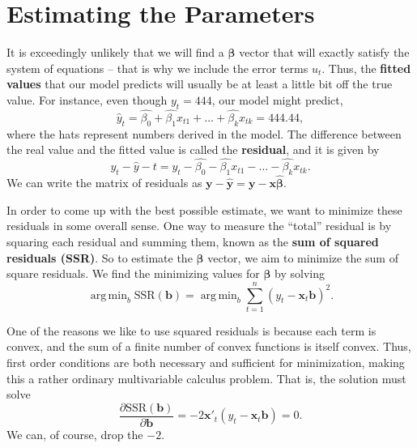 \documentclass[12pt]{article}
\renewcommand{\vec}[1]{\mathbf{#1}}
\renewcommand{\hat}[1]{\widehat{#1}}
\DeclareMathOperator*{\argmin}{arg\,min}
\theoremstyle{definition}
\begin{document}
\section{Estimating the Parameters}
It is exceedingly unlikely that we will find a $\bm{\beta}$ vector that will exactly satisfy the system of equations -- that is why we include the error terms $u_t$. Thus, the \textbf{fitted values} that our model predicts will usually be at least a little bit off the true value. For instance, even though $y_t=444$, our model might predict,
	\[	\hat{y}_t =\hat{\beta_0} + \hat{\beta_1}x_{t1} + \hdots + \hat{\beta_k} x_{tk} =  444.44,	\]
where the hats represent numbers derived in the model. The difference between the real value and the fitted value is called the \textbf{residual}, and it is given by 
	\[	y_t - \hat{y}-t = y_t - \hat{\beta_0} - \hat{\beta_1} x_{t1} - \hdots - \hat{\beta_k} x_{tk}.\]
We can write the matrix of residuals as $\vec{y} - \vec{\hat{y}} = \vec{y} - \vec{x}\bm{\hat{\beta}}$. 

In order to come up with the best possible estimate, we want to minimize these residuals in some overall sense. One way to measure the ``total'' residual is by squaring each residual and summing them, known as the \textbf{sum of squared residuals (SSR)}. So to estimate the $\bm{\beta}$ vector, we aim to minimize the sum of square residuals. We find the minimizing values for $\bm{\beta}$ by solving
\begin{equation}
	\argmin_{b} \text{SSR}(\vec{b}) = \argmin_b \sum_{t=1}^n ( y_t - \vec{x}_t \vec{b})^2.	
\end{equation}

One of the reasons we like to use squared residuals is because each term is convex, and the sum of a finite number of convex functions is itself convex. Thus, first order conditions are both necessary and sufficient for minimization, making this a rather ordinary multivariable calculus problem. That is, the solution must solve
	\[  \frac{\partial \text{SSR}(\vec{b})}{\partial \vec{b}} = -2\vec{x}'_t(y_t - \vec{x}_t \vec{b}) =0.	\]
We can, of course, drop the $-2$. 
\end{document}
